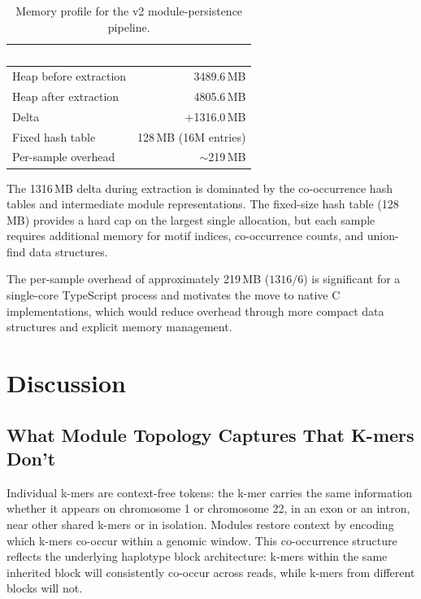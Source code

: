 \documentclass{../yalumba}
\begin{document}
\begin{table}[htbp]
\centering
\tablestyle
\caption{Memory profile for the v2 module-persistence pipeline.}
\label{tab:memory}
\begin{tabular}{@{}lr@{}}
\toprule
\rowcolor{table-header}
\textcolor{white}{\textbf{Metric}} &
\textcolor{white}{\textbf{Value}} \\
\midrule
Heap before extraction  & 3489.6\,MB \\
Heap after extraction   & 4805.6\,MB \\
Delta                   & $+$1316.0\,MB \\
Fixed hash table        & 128\,MB (16M entries) \\
Per-sample overhead     & $\sim$219\,MB \\
\bottomrule
\end{tabular}
\end{table}

The 1316\,MB delta during extraction is dominated by the co-occurrence hash
tables and intermediate module representations.  The fixed-size hash table
(128\,MB) provides a hard cap on the largest single allocation, but each sample
requires additional memory for motif indices, co-occurrence counts, and union-find
data structures.

The per-sample overhead of approximately 219\,MB ($1316 / 6$) is significant
for a single-core TypeScript process and motivates the move to native C
implementations, which would reduce overhead through more compact data
structures and explicit memory management.


\section{Discussion}
\label{sec:discussion}

\subsection{What Module Topology Captures That K-mers Don't}

Individual k-mers are context-free tokens: the k-mer 
carries the same information whether it appears on chromosome 1 or chromosome 22,
in an exon or an intron, near other shared k-mers or in isolation.  Modules
restore context by encoding which k-mers co-occur within a genomic window.
This co-occurrence structure reflects the underlying haplotype block
architecture: k-mers within the same inherited block will consistently co-occur
across reads, while k-mers from different blocks will not.
\end{document}
